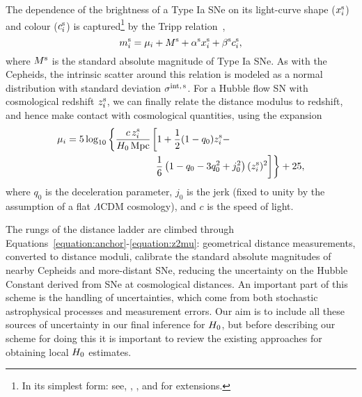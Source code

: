 \documentclass[a4paper,fleqn,usenatbib]{mnras}
\newcommand{\Mstds}{\ensuremath{M^{\rm s}}}
\newcommand{\sigints}{\ensuremath{\sigma^{\rm int,\,s}}}
\newcommand{\xsalt}{\ensuremath{x^{\rm s}}}
\newcommand{\csalt}{\ensuremath{c^{\rm s}}}
\newcommand{\xsalts}{\ensuremath{x_i^{\rm s}}}
\newcommand{\csalts}{\ensuremath{c_i^{\rm s}}}
\newcommand{\alphas}{\ensuremath{\alpha^{\rm s}}}
\newcommand{\betas}{\ensuremath{\beta^{\rm s}}}
\newcommand{\msup}{\ensuremath{m_i^{\rm s}}}
\newcommand{\decel}{\ensuremath{q_0}}
\newcommand{\zs}{\ensuremath{z_i^{\rm s}}}
\begin{document}
{The dependence of the brightness of a Type Ia SNe on its light-curve shape ($\xsalts$) and colour ($\csalts$) is captured\footnote{In its simplest form: see, \eg, \citet{Marriner_etal:2011}, \citet{Shariff_etal:2016} and \citet{Mandel_etal:2016} for extensions.} by the Tripp relation~\citep{Phillips:1993,Tripp:1998},
\begin{equation}
\msup = \mu_i + \Mstds + \alphas \xsalt_i + \betas \csalt_i,
\label{equation:tripp}
\end{equation}
where $\Mstds$ is the standard absolute magnitude of Type Ia SNe. As with the Cepheids, the intrinsic scatter around this relation is modeled as a normal distribution with standard deviation $\sigints$. For a Hubble flow SN with cosmological redshift $\zs$, we can finally relate the distance modulus to redshift, and hence make contact with cosmological quantities, using the expansion
\begin{align}
\mu_i = 5 \log_{10} \left\{ \frac{c\,\zs}{\hubble \, {\rm Mpc}} \right. & \bigg[ 1 + \frac{1}{2}(1 - \decel) \zs - \nonumber\\
& \left.\left. \frac{1}{6}\left(1 - \decel - 3\decel ^ 2 + j_0^2\right) (\zs)^2 \right] \right\} + 25,
\label{equation:z2mu}
\end{align}
where $\decel$ is the deceleration parameter, $j_0$ is the jerk (fixed to unity by the assumption of a flat $\Lambda$CDM cosmology), and $c$ is the speed of light.

The rungs of the distance ladder are climbed through Equations~\ref{equation:anchor}-\ref{equation:z2mu}: geometrical distance measurements, converted to distance moduli, calibrate the standard absolute magnitudes of nearby Cepheids and more-distant SNe, reducing the uncertainty on the Hubble Constant derived from SNe at cosmological distances. An important part of this scheme is the handling of uncertainties, which come from both stochastic astrophysical processes and measurement errors.  Our aim is to include all these sources of uncertainty in our final inference for $H_0$, but before describing our scheme for doing this it is important to review the existing approaches for obtaining local $H_0$ estimates.


}
\end{document}
